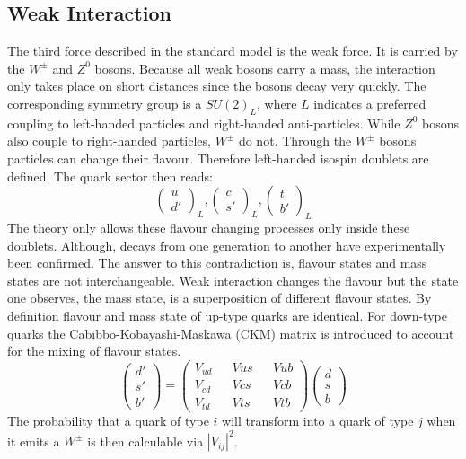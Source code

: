 	\subsection{Weak Interaction}
	The third force described in the standard model is the weak force. It is carried by the $W^\pm$ and $Z^0$ bosons. Because all weak bosons carry a mass, the interaction only takes place on short distances since the bosons decay very quickly. The corresponding symmetry group is a $SU(2)_L$, where $L$ indicates a preferred coupling to left-handed particles and right-handed anti-particles. While $Z^0$ bosons also couple to right-handed particles, $W^\pm$ do not. Through the $W^\pm$ bosons particles can change their flavour. Therefore left-handed isospin doublets are defined. The quark sector then reads:
	\begin{equation}
	\begin{pmatrix}	u \\ d'	\end{pmatrix}_L,
	\begin{pmatrix}	c \\ s'	\end{pmatrix}_L,
	\begin{pmatrix}	t \\ b'	\end{pmatrix}_L
	\end{equation}
	The theory only allows these flavour changing processes only inside these doublets. Although, decays from one generation to another have experimentally been confirmed. The answer to this contradiction is, flavour states and mass states are not interchangeable. Weak interaction changes the flavour but the state one observes, the mass state, is a superposition of different flavour states. By definition flavour and mass state of up-type quarks are identical. For down-type quarks the Cabibbo-Kobayashi-Maskawa (CKM) matrix is introduced to account for the mixing of flavour states.
	\begin{equation}
	\begin{pmatrix}d'\\s'\\b'\end{pmatrix} = 
	\begin{pmatrix}
	V_{ud}&&V{us}&&V{ub} \\
	V_{cd}&&V{cs}&&V{cb} \\
	V_{td}&&V{ts}&&V{tb}
	\end{pmatrix}
	\begin{pmatrix}d\\s\\b\end{pmatrix}
	\end{equation}
	The probability that a quark of type $i$ will transform into a quark of type $j$ when it emits a $W^\pm$ is then calculable via $|V_{ij}|^2$. 

